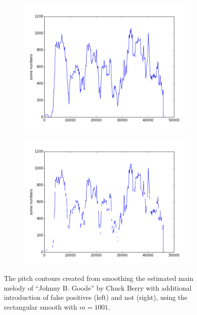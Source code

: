 \begin{figure}[b]
        \centering
        \begin{subfigure}[b]{0.48\textwidth}
                \includegraphics[width=\textwidth]{Figures/smoothing_1001_false}
                \vspace{20pt}
        \end{subfigure}
        \begin{subfigure}[b]{0.48\textwidth}
                \includegraphics[width=\textwidth]{Figures/smoothing_1001_true}
                \vspace{20pt}
        \end{subfigure}
    \caption{The pitch contours created from smoothing the estimated main melody of ``Johnny B. Goode'' by Chuck Berry with additional introduction of false positives (left) and not (right), using the rectangular smooth with $m = 1001$.}
	\label{fig:excludezeros}
\end{figure}


